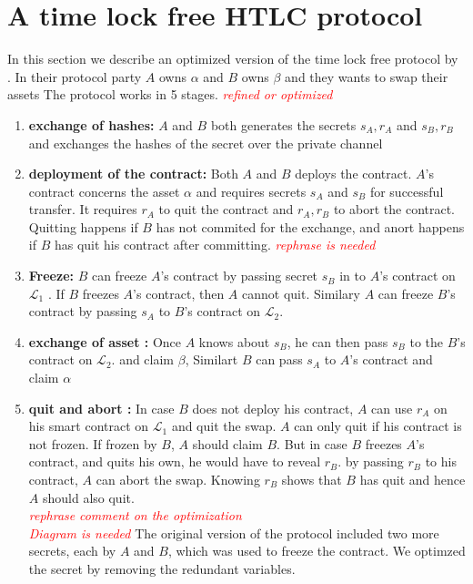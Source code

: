 \documentclass[manuscript,screen,review]{acmart}
\newcommand{\com}[1]{\textcolor{red}{\textit{#1}}}
\begin{document}
\section{A time lock free HTLC protocol}
In this section we describe an optimized version of the time lock free protocol by \cite{}. In their protocol party $A$ owns $\alpha$ and $B$ owns $\beta$ and they wants to swap their assets
The protocol works in 5 stages.
\com{refined or optimized}
\begin{enumerate}
	\item\textbf{ exchange of hashes:}  $A$ and $B$ both generates the secrets $s_A, r_A$ and $s_B, r_B$ and exchanges the hashes of the secret over the private channel
	\item \textbf{deployment of the contract:} Both $A$ and $B$ deploys the contract. $A$'s contract concerns the asset $\alpha$ and requires secrets $s_A$ and $s_B$ for successful transfer. It requires $r_A$ to quit the contract and $r_A, r_B$ to abort the contract. Quitting happens if $B$ has not commited for the exchange, and anort happens if $B$ has quit his contract after committing. 
	\com {rephrase is needed}
	\item \textbf{Freeze:} $B$ can freeze $A$'s contract by passing secret $s_B$ in to $A$'s contract on $\mathcal{L}_1$ . If $B$ freezes $A$'s contract, then $A$ cannot quit. Similary $A$ can freeze $B$'s contract by passing $s_A$ to $B$'s contract on $\mathcal{L}_2$. 
	\item \textbf{exchange of asset :} Once $A$ knows about $s_B$, he can then pass $s_B$ to the $B$'s contract on $\mathcal{L}_2$.  and claim $\beta$, Similart $B$ can pass $s_A$ to $A$'s contract and claim $\alpha$
	\item \textbf{quit and abort :} In case $B$ does not deploy his contract, $A$ can use $r_A$ on his smart contract on $\mathcal{L}_1$ and quit the swap. $A$ can only quit if his contract is not frozen. If frozen by $B$, $A$ should claim $B$. But in case $B$ freezes $A$'s contract, and quits his own, he would have to reveal $r_B$. by passing $r_B$ to his contract, $A$ can abort the swap. Knowing $r_B$ shows that $B$ has quit and hence $A$ should also quit. \\
	\com{rephrase}
	\com{comment on the optimization}\\
	\com{Diagram is needed}
	The original version of the protocol included two more secrets, each by $A$ and $B$, which was used to freeze the contract. We optimzed the secret by removing the redundant variables.

	
\end{enumerate}
\end{document}
